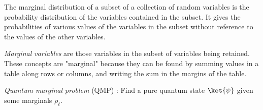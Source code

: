 The
 {marginal
distribution} of a subset of a collection of random variables is the
probability distribution of the variables contained in the subset. It gives
the probabilities of various values of the variables in the subset without
reference to the values of the other variables.

\emph{Marginal variables} are those variables in the subset of variables being
retained. These concepts are "marginal" because they can be found by summing
values in a table along rows or columns, and writing the sum in the margins
of the table.

\emph{Quantum marginal problem} (QMP) : Find a pure quantum state $\ket{\psi}$
given some marginals $\rho_\ell$.

